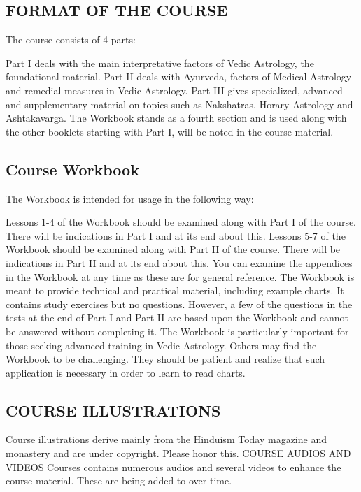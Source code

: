 \subsection{FORMAT OF THE COURSE}
  The course consists of 4 parts:

Part I deals with the main interpretative factors of Vedic Astrology, the foundational material.
Part II deals with Ayurveda, factors of Medical Astrology and remedial measures in Vedic Astrology.
Part III gives specialized, advanced and supplementary material on topics such as Nakshatras, Horary Astrology and Ashtakavarga.
The Workbook stands as a fourth section and is used along with the other booklets starting with Part I, will be noted in the course material.
 
\subsection{Course Workbook}
The Workbook is intended for usage in the following way:

Lessons 1-4 of the Workbook should be examined along with Part I of the course. There will be indications in Part I and at its end about this.
Lessons 5-7 of the Workbook should be examined along with Part II of the course. There will be indications in Part II and at its end about this.
You can examine the appendices in the Workbook at any time as these are for general reference.
  The Workbook is meant to provide technical and practical material, including example charts. It contains study exercises but no questions. However, a few of the questions in the tests at the end of Part I and Part II are based upon the Workbook and cannot be answered without completing it. The Workbook is particularly important for those seeking advanced training in Vedic Astrology. Others may find the Workbook to be challenging. They should be patient and realize that such application is necessary in order to learn to read charts.  

\subsection{COURSE ILLUSTRATIONS}
Course illustrations derive mainly from the Hinduism Today magazine and monastery and are under copyright. Please honor this.   COURSE AUDIOS AND VIDEOS Courses contains numerous audios and several videos to enhance the course material. These are being added to over time.  


 

